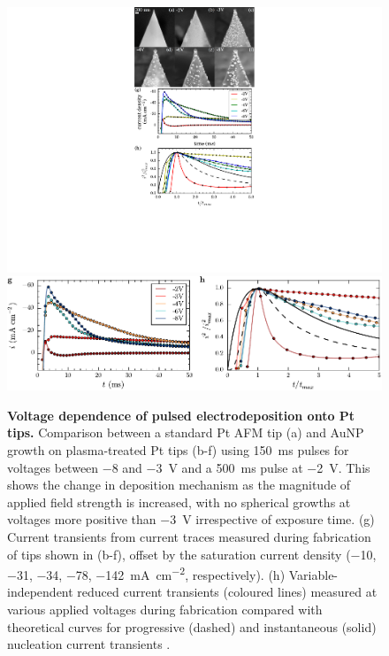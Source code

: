 \documentclass{article}
\begin{document}
\begin{figure}[bt]
\centering
\includegraphics{figures/tip_voltage_dependence}\\
\includegraphics{figures/current_transients}
\caption[Voltage dependence of pulsed electrodeposition onto Pt tips]{\textbf{Voltage dependence of pulsed electrodeposition onto Pt tips.} Comparison between a standard Pt AFM tip (a) and AuNP growth on plasma-treated Pt tips (b-f) using \SI{150}{ms} pulses for voltages between \num{-8} and \SI{-3}{V} and a \SI{500}{ms} pulse at \SI{-2}{V}. This shows the change in deposition mechanism as the magnitude of applied field strength is increased, with no spherical growths at voltages more positive than \SI{-3}{V} irrespective of exposure time. (g) Current transients from current traces measured during fabrication of tips shown in (b-f), offset by the saturation current density (\num{-10}, \num{-31}, \num{-34}, \num{-78}, \SI{-142}{\milli\ampere\per\centi\metre\squared}, respectively). (h) Variable-independent reduced current transients (coloured lines) measured at various applied voltages during fabrication compared with theoretical curves for progressive (dashed) and instantaneous (solid) nucleation current transients \cite{scharifker1983}.}
\label{fig:electrochemical_voltage_dependence}
\end{figure}
\end{document}
